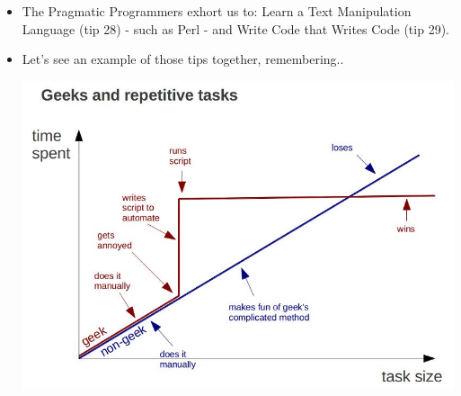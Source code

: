 \documentclass[aspectratio=169]{beamer}
\newcommand{\pitem}{\pause \item}
\begin{document}
\begin{frame}[fragile]
    \begin{itemize}
    \item
    The \alert{Pragmatic Programmers} exhort us to:
      \alert{Learn a Text Manipulation Language (tip 28)} - such as \alert{Perl} - and
      \alert{Write Code that Writes Code (tip 29)}.


    \pitem
    Let's see an example of those tips together, remembering..

\centering
\vspace{10pt}
\includegraphics[height=0.7\textheight]{Geeks.jpg}

    \end{itemize}
\end{frame}
\end{document}

